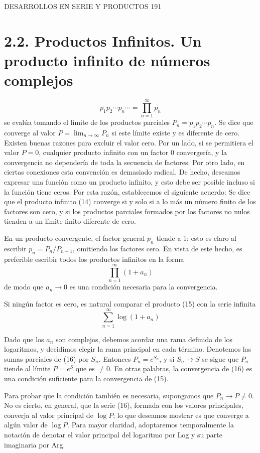 \documentclass{article}
\theoremstyle{nonumberplain}
\begin{document}
DESARROLLOS EN SERIE Y PRODUCTOS
191

\section{2.2. Productos Infinitos. Un producto infinito de números complejos}
\[
p_{1} p_{2} \cdots p_{n} \cdots=\prod_{n=1}^{\infty} p_{n}
\]
se evalúa tomando el límite de los productos parciales \( P_{n}=p_{1} p_{2} \cdots p_{n} \). Se dice que converge al valor \( P=\lim _{n \rightarrow \infty} P_{n} \) si este límite existe y es diferente de cero. Existen buenas razones para excluir el valor cero. Por un lado, si se permitiera el valor \( P=0 \), cualquier producto infinito con un factor 0 convergería, y la convergencia no dependería de toda la secuencia de factores. Por otro lado, en ciertas conexiones esta convención es demasiado radical. De hecho, deseamos expresar una función como un producto infinito, y esto debe ser posible incluso si la función tiene ceros. Por esta razón, establecemos el siguiente acuerdo: Se dice que el producto infinito (14) converge si y solo si a lo más un número finito de los factores son cero, y si los productos parciales formados por los factores no nulos tienden a un límite finito diferente de cero.

En un producto convergente, el factor general \( p_{n} \) tiende a 1; esto es claro al escribir \( p_{n}=P_{n} / P_{n-1} \), omitiendo los factores cero. En vista de este hecho, es preferible escribir todos los productos infinitos en la forma
\[
\prod_{n=1}^{\infty}\left(1+a_{n}\right)
\]
de modo que \( a_{n} \rightarrow 0 \) es una condición necesaria para la convergencia.

Si ningún factor es cero, es natural comparar el producto (15) con la serie infinita
\[
\sum_{n=1}^{\infty} \log \left(1+a_{n}\right)
\]

Dado que los \( a_{n} \) son complejos, debemos acordar una rama definida de los logaritmos, y decidimos elegir la rama principal en cada término. Denotemos las sumas parciales de (16) por \( S_{n} \). Entonces \( P_{n}=e^{S_{n}} \), y si \( S_{n} \rightarrow S \) se sigue que \( P_{n} \) tiende al límite \( P=e^{S} \) que es \( \neq 0 \). En otras palabras, la convergencia de (16) es una condición suficiente para la convergencia de (15).

Para probar que la condición también es necesaria, supongamos que \( P_{n} \rightarrow P \neq 0 \). No es cierto, en general, que la serie (16), formada con los valores principales, converja al valor principal de \( \log P \); lo que deseamos mostrar es que converge a algún valor de \( \log P \). Para mayor claridad, adoptaremos temporalmente la notación de denotar el valor principal del logaritmo por Log y su parte imaginaria por Arg.
\end{document}
